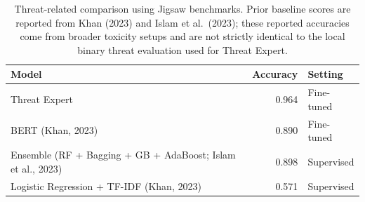 
\begin{table}[htbp]
\centering
\caption{Threat-related comparison using Jigsaw benchmarks. Prior baseline scores are reported from Khan (2023) and Islam et al.\ (2023); these reported accuracies come from broader toxicity setups and are not strictly identical to the local binary threat evaluation used for Threat Expert.}
\label{tab:jigsaw-threat-benchmark-comparison}
\small
\begin{tabular}{p{8.2cm} r p{2.0cm}}
\toprule
Model & Accuracy & Setting \\
\midrule
Threat Expert & 0.964 & Fine-tuned \\
BERT (Khan, 2023) & 0.890 & Fine-tuned \\
Ensemble (RF + Bagging + GB + AdaBoost; Islam et al., 2023) & 0.898 & Supervised \\
Logistic Regression + TF-IDF (Khan, 2023) & 0.571 & Supervised \\
\bottomrule
\end{tabular}
\end{table}
